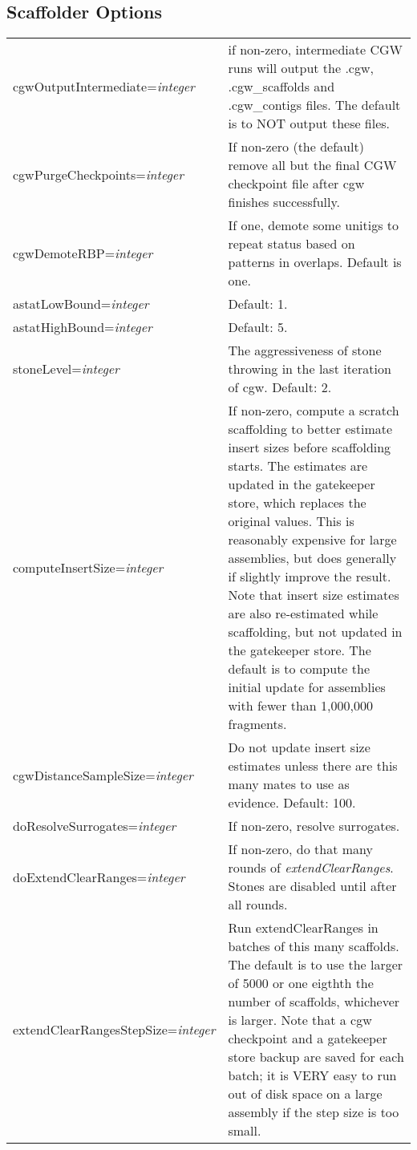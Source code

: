 \documentclass[twoside,11pt]{article}
\begin{document}
\subsection{Scaffolder Options}
\label{sec:scafopts}

\begin{longtable}{lp{3.0in}}

cgwOutputIntermediate={\it integer} &
if non-zero, intermediate CGW runs will output the .cgw,
.cgw\_scaffolds and .cgw\_contigs files.  The default is to NOT output
these files.
\\

cgwPurgeCheckpoints={\it integer} &
If non-zero (the default) remove all but the final CGW checkpoint file
after cgw finishes successfully.
\\

cgwDemoteRBP={\it integer} &
If one, demote some unitigs to repeat status based on patterns in
overlaps.  Default is one.
\\

astatLowBound={\it integer} &
Default: 1.
\\

astatHighBound={\it integer} &
Default: 5.
\\

stoneLevel={\it integer} &
The aggressiveness of stone throwing in the last iteration of cgw.  Default: 2.
\\

computeInsertSize={\it integer} &
If non-zero, compute a scratch scaffolding to better estimate insert
sizes before scaffolding starts.  The estimates are updated in the
gatekeeper store, which replaces the original values.  This is
reasonably expensive for large assemblies, but does generally if
slightly improve the result.  Note that insert size estimates are also
re-estimated while scaffolding, but not updated in the gatekeeper
store.  The default is to compute the initial update for assemblies
with fewer than 1,000,000 fragments.
\\

cgwDistanceSampleSize={\it integer} &
Do not update insert size estimates unless there are this many mates to use as evidence.
Default: 100.
\\

doResolveSurrogates={\it integer} &
If non-zero, resolve surrogates.
\\

doExtendClearRanges={\it integer} &
If non-zero, do that many rounds of {\it extendClearRanges}.  Stones are disabled
until after all rounds.
\\

extendClearRangesStepSize={\it integer} &
Run extendClearRanges in batches of this many scaffolds.  The default
is to use the larger of 5000 or one eigthth the number of scaffolds,
whichever is larger.  Note that a cgw checkpoint and a gatekeeper store
backup are saved for each batch; it is VERY easy to run out of disk space
on a large assembly if the step size is too small.
\\

\end{longtable}
\end{document}
